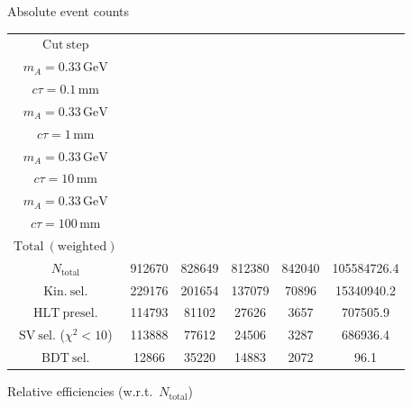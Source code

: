 \documentclass[10pt,a4paper]{article}
\renewcommand{\arraystretch}{1.4}
\begin{document}
{\footnotesize\setlength{\tabcolsep}{4pt}\renewcommand{\arraystretch}{1.05}%
\vspace{12pt}

Absolute event counts

\begin{tabular}{cccccc}
\toprule
$\mathrm{Cut\ step}$ & \shortstack{$m_{\pi}=1\,\mathrm{GeV}$\\$m_{A}=0.33\,\mathrm{GeV}$\\$c\tau=0.1\,\mathrm{mm}$} & \shortstack{$m_{\pi}=1\,\mathrm{GeV}$\\$m_{A}=0.33\,\mathrm{GeV}$\\$c\tau=1\,\mathrm{mm}$} & \shortstack{$m_{\pi}=1\,\mathrm{GeV}$\\$m_{A}=0.33\,\mathrm{GeV}$\\$c\tau=10\,\mathrm{mm}$} & \shortstack{$m_{\pi}=1\,\mathrm{GeV}$\\$m_{A}=0.33\,\mathrm{GeV}$\\$c\tau=100\,\mathrm{mm}$} & \shortstack{$\mathrm{QCD}$\\$\mathrm{Total\ (weighted)}$} \\
\midrule
$N_{\mathrm{total}}$ & 912670 & 828649 & 812380 & 842040 & 105584726.4\\
$\mathrm{Kin.\ sel.}$ & 229176 & 201654 & 137079 & 70896 & 15340940.2\\
$\mathrm{HLT\ presel.}$ & 114793 & 81102 & 27626 & 3657 & 707505.9\\
$\mathrm{SV\ sel.}$ ($\chi^2{<}10$) & 113888 & 77612 & 24506 & 3287 & 686936.4\\
$\mathrm{BDT\ sel.}$ & 12866 & 35220 & 14883 & 2072 & 96.1\\
\bottomrule
\end{tabular}

\vspace{18pt}

Relative efficiencies (w.r.t.\ $N_{\mathrm{total}}$)

}
\end{document}
